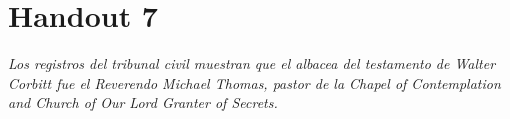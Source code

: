 \chapter{Handout 7}

\emph{Los registros del tribunal civil muestran que el albacea del testamento de
Walter Corbitt fue el Reverendo Michael Thomas, pastor de la \emph{Chapel of
Contemplation and Church of Our Lord Granter of Secrets}.}


